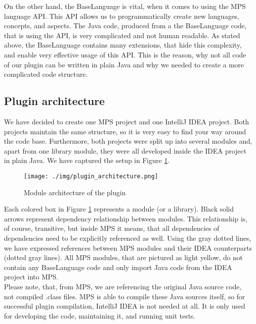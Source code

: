 On the other hand, the BaseLanguage is vital, when it comes to using the MPS language API.
This API allows us to programmatically create new languages, concepts, and aspects.
The Java code, produced from a the BaseLanguage code, that is using the API, is very complicated and not human readable.
As stated above, the BaseLanguage contains many extensions, that hide this complexity, and enable very effective usage of this API.
This is the reason, why not all code of our plugin can be written in plain Java and why we needed to create a more complicated code structure.

\subsection{Plugin architecture}

We have decided to create one MPS project and one IntelliJ IDEA project.
Both projects maintain the same structure, so it is very easy to find your way around the code base.
Furthermore, both projects were split up into several modules and, apart from one library module, they were all developed inside the IDEA project in plain Java.
We have captured the setup in Figure \ref{fig:plugin_architecture}. 

\begin{figure}[h]
	\centering
	\texttt{[image: ./img/plugin\_architecture.png]}
	\caption{Module architecture of the plugin}
	\label{fig:plugin_architecture}
\end{figure}

Each colored box in Figure \ref{fig:plugin_architecture} represents a module (or a library).
Black solid arrows represent dependency relationship between modules.
This relationship is, of course, transitive, but inside MPS it means, that all dependencies of dependencies need to be explicitly referenced as well.
Using the gray dotted lines, we have expressed references between MPS modules and their IDEA counterparts (dotted gray lines).
All MPS modules, that are pictured as light yellow, do not contain any BaseLanguage code and only import Java code from the IDEA project into MPS.
\\

Please note, that, from MPS, we are referencing the original Java source code, not compiled .class files.
MPS is able to compile these Java sources itself, so for successful plugin compilation, IntelliJ IDEA is not needed at all.
It is only used for developing the code, maintaining it, and running unit tests.

